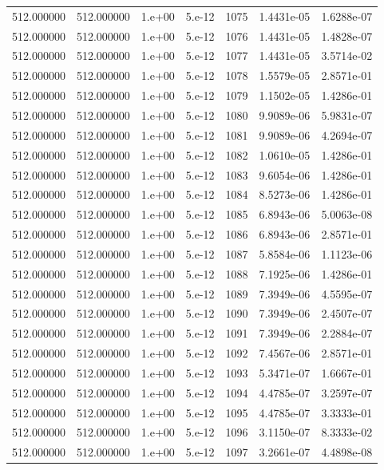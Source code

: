 \begin{table}[htbp]
\begin{tabular}{rrrrrrr}
512.000000 & 512.000000 & 1.e+00 & 5.e-12 & 1075 & 1.4431e-05 & 1.6288e-07 \\
512.000000 & 512.000000 & 1.e+00 & 5.e-12 & 1076 & 1.4431e-05 & 1.4828e-07 \\
512.000000 & 512.000000 & 1.e+00 & 5.e-12 & 1077 & 1.4431e-05 & 3.5714e-02 \\
512.000000 & 512.000000 & 1.e+00 & 5.e-12 & 1078 & 1.5579e-05 & 2.8571e-01 \\
512.000000 & 512.000000 & 1.e+00 & 5.e-12 & 1079 & 1.1502e-05 & 1.4286e-01 \\
512.000000 & 512.000000 & 1.e+00 & 5.e-12 & 1080 & 9.9089e-06 & 5.9831e-07 \\
512.000000 & 512.000000 & 1.e+00 & 5.e-12 & 1081 & 9.9089e-06 & 4.2694e-07 \\
512.000000 & 512.000000 & 1.e+00 & 5.e-12 & 1082 & 1.0610e-05 & 1.4286e-01 \\
512.000000 & 512.000000 & 1.e+00 & 5.e-12 & 1083 & 9.6054e-06 & 1.4286e-01 \\
512.000000 & 512.000000 & 1.e+00 & 5.e-12 & 1084 & 8.5273e-06 & 1.4286e-01 \\
512.000000 & 512.000000 & 1.e+00 & 5.e-12 & 1085 & 6.8943e-06 & 5.0063e-08 \\
512.000000 & 512.000000 & 1.e+00 & 5.e-12 & 1086 & 6.8943e-06 & 2.8571e-01 \\
512.000000 & 512.000000 & 1.e+00 & 5.e-12 & 1087 & 5.8584e-06 & 1.1123e-06 \\
512.000000 & 512.000000 & 1.e+00 & 5.e-12 & 1088 & 7.1925e-06 & 1.4286e-01 \\
512.000000 & 512.000000 & 1.e+00 & 5.e-12 & 1089 & 7.3949e-06 & 4.5595e-07 \\
512.000000 & 512.000000 & 1.e+00 & 5.e-12 & 1090 & 7.3949e-06 & 2.4507e-07 \\
512.000000 & 512.000000 & 1.e+00 & 5.e-12 & 1091 & 7.3949e-06 & 2.2884e-07 \\
512.000000 & 512.000000 & 1.e+00 & 5.e-12 & 1092 & 7.4567e-06 & 2.8571e-01 \\
512.000000 & 512.000000 & 1.e+00 & 5.e-12 & 1093 & 5.3471e-07 & 1.6667e-01 \\
512.000000 & 512.000000 & 1.e+00 & 5.e-12 & 1094 & 4.4785e-07 & 3.2597e-07 \\
512.000000 & 512.000000 & 1.e+00 & 5.e-12 & 1095 & 4.4785e-07 & 3.3333e-01 \\
512.000000 & 512.000000 & 1.e+00 & 5.e-12 & 1096 & 3.1150e-07 & 8.3333e-02 \\
512.000000 & 512.000000 & 1.e+00 & 5.e-12 & 1097 & 3.2661e-07 & 4.4898e-08 \\

\end{tabular}
\end{table}
